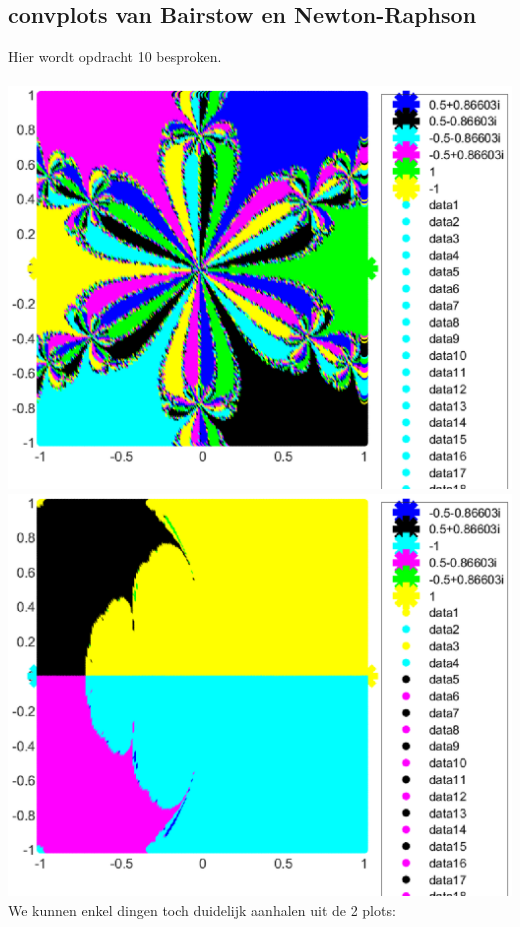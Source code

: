 \documentclass[a4paper,kulak]{kulakarticle}
\begin{document}
\subsection{convplots van Bairstow en Newton-Raphson}
Hier wordt opdracht 10 besproken.
\\~\\
\includegraphics[]{nrPlot}
\includegraphics[]{brPlot}
We kunnen enkel dingen toch duidelijk aanhalen uit de 2 plots:
\end{document}

